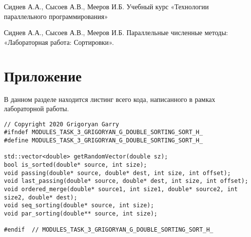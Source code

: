 \documentclass{report}
\begin{document}
\newpage

\begin{thebibliography}{1}

Сиднев А.А., Сысоев А.В., Мееров И.Б. Учебный курс «Технологии параллельного программирования»

Сиднев А.А., Сысоев А.В., Мееров И.Б. Параллельные численные методы: «Лабораторная работа: Сортировки».

\end{thebibliography}
\newpage

\section*{Приложение}
В данном разделе находится листинг всего кода, написанного в рамках лабораторной работы.
\begin{lstlisting}
// Copyright 2020 Grigoryan Garry
#ifndef MODULES_TASK_3_GRIGORYAN_G_DOUBLE_SORTING_SORT_H_
#define MODULES_TASK_3_GRIGORYAN_G_DOUBLE_SORTING_SORT_H_

std::vector<double> getRandomVector(double sz);
bool is_sorted(double* source, int size);
void passing(double* source, double* dest, int size, int offset);
void last_passing(double* source, double* dest, int size, int offset);
void ordered_merge(double* source1, int size1, double* source2, int size2, double* dest);
void seq_sorting(double* source, int size);
void par_sorting(double** source, int size);

#endif  // MODULES_TASK_3_GRIGORYAN_G_DOUBLE_SORTING_SORT_H_

\end{lstlisting}
\newpage
\end{document}
